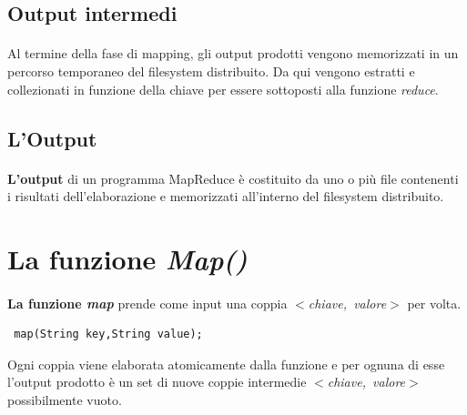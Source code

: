 \documentclass[a4paper,11pt]{report}
\begin{document}
\subsection{Output intermedi}
\paragraph{}Al termine della fase di mapping, gli output prodotti vengono memorizzati in un percorso temporaneo del filesystem distribuito.
Da qui vengono estratti e 
collezionati in funzione della chiave per essere sottoposti alla funzione \emph{reduce}.
\subsection{L'Output}
\paragraph{}\textbf{L'output} di un programma MapReduce è costituito da uno o più file contenenti i risultati dell'elaborazione e
memorizzati all'interno del filesystem
 distribuito. 
\paragraph{} 
\section{La funzione \emph{Map()}}
\paragraph{} \textbf{La funzione \emph{map}} prende come input una coppia \emph{\mbox{$<$chiave, valore$>$}} per volta.
\begin{verbatim}
 map(String key,String value);
\end{verbatim}

Ogni coppia viene elaborata atomicamente dalla funzione e per ognuna di esse l'output prodotto è un set di nuove coppie intermedie
\emph{\mbox{$<$chiave, valore$>$}} possibilmente
vuoto. 
\end{document}

